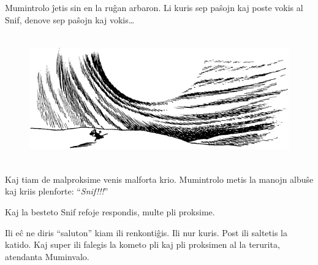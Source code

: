 Mumintrolo ĵetis sin en la ruĝan arbaron. Li kuris sep paŝojn kaj poste vokis al Snif, denove sep paŝojn kaj vokis{\ldots}

\begin{figure}[htbp]
\centering
\includegraphics[width=400pt,height=156pt]{9-9.png}
\caption{}
\label{9-9}
\end{figure}

Kaj tiam de malproksime venis malforta krio. Mumintrolo metis la manojn albuŝe kaj kriis plenforte: ``\emph{Snif!!!}''

Kaj la besteto Snif refoje respondis, multe pli proksime.

Ili eĉ ne diris ``saluton'' kiam ili renkontiĝis. Ili nur kuris. Post ili saltetis la katido. Kaj super ili falegis la kometo pli kaj pli proksimen al la terurita, atendanta Muminvalo.

